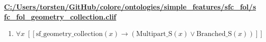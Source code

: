 \documentclass{article}
\begin{document}
\textbf{\url{C:/Users/torsten/GitHub/colore/ontologies/simple\_features/sfc\_fol/sfc\_fol\_geometry\_collection.clif}}

\begin{enumerate}
\item $\forall x\;  \left[ \left[ \textrm{sf\_geometry\_collection}(x) \rightarrow \left(\textrm{Multipart\_S}(x) \lor \textrm{Branched\_S}(x)\right) \right] \right]$
\end{enumerate}
\end{document}
